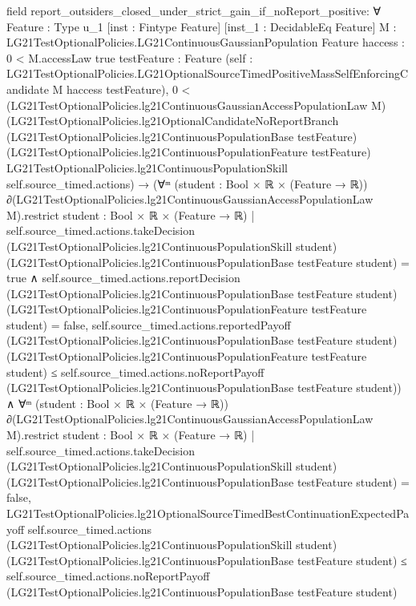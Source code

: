 \documentclass[10pt]{article}
\begin{document}
\begin{ReviewVerbatim}
field report_outsiders_closed_under_strict_gain_if_noReport_positive:
∀ {Feature : Type u_1} [inst : Fintype Feature] [inst_1 : DecidableEq Feature]
  {M : LG21TestOptionalPolicies.LG21ContinuousGaussianPopulation Feature} {haccess : 0 < M.accessLaw {true}}
  {testFeature : Feature}
  (self : LG21TestOptionalPolicies.LG21OptionalSourceTimedPositiveMassSelfEnforcingCandidate M haccess testFeature),
  0 <
      (LG21TestOptionalPolicies.lg21ContinuousGaussianAccessPopulationLaw M)
        (LG21TestOptionalPolicies.lg21OptionalCandidateNoReportBranch
          (LG21TestOptionalPolicies.lg21ContinuousPopulationBase testFeature)
          (LG21TestOptionalPolicies.lg21ContinuousPopulationFeature testFeature)
          LG21TestOptionalPolicies.lg21ContinuousPopulationSkill self.source_timed.actions) →
    (∀ᵐ (student :
        Bool ×
          ℝ ×
            (Feature →
              ℝ)) ∂(LG21TestOptionalPolicies.lg21ContinuousGaussianAccessPopulationLaw M).restrict
          {student : Bool × ℝ × (Feature → ℝ) |
            self.source_timed.actions.takeDecision (LG21TestOptionalPolicies.lg21ContinuousPopulationSkill student)
                  (LG21TestOptionalPolicies.lg21ContinuousPopulationBase testFeature student) =
                true ∧
              self.source_timed.actions.reportDecision
                  (LG21TestOptionalPolicies.lg21ContinuousPopulationBase testFeature student)
                  (LG21TestOptionalPolicies.lg21ContinuousPopulationFeature testFeature student) =
                false},
        self.source_timed.actions.reportedPayoff
            (LG21TestOptionalPolicies.lg21ContinuousPopulationBase testFeature student)
            (LG21TestOptionalPolicies.lg21ContinuousPopulationFeature testFeature student) ≤
          self.source_timed.actions.noReportPayoff
            (LG21TestOptionalPolicies.lg21ContinuousPopulationBase testFeature student)) ∧
      ∀ᵐ (student :
        Bool ×
          ℝ ×
            (Feature →
              ℝ)) ∂(LG21TestOptionalPolicies.lg21ContinuousGaussianAccessPopulationLaw M).restrict
          {student : Bool × ℝ × (Feature → ℝ) |
            self.source_timed.actions.takeDecision (LG21TestOptionalPolicies.lg21ContinuousPopulationSkill student)
                (LG21TestOptionalPolicies.lg21ContinuousPopulationBase testFeature student) =
              false},
        LG21TestOptionalPolicies.lg21OptionalSourceTimedBestContinuationExpectedPayoff self.source_timed.actions
            (LG21TestOptionalPolicies.lg21ContinuousPopulationSkill student)
            (LG21TestOptionalPolicies.lg21ContinuousPopulationBase testFeature student) ≤
          self.source_timed.actions.noReportPayoff
            (LG21TestOptionalPolicies.lg21ContinuousPopulationBase testFeature student)


\end{ReviewVerbatim}
\end{document}
